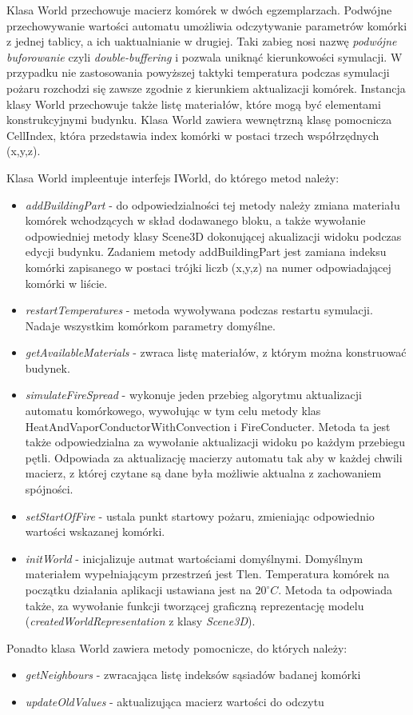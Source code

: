 Klasa World przechowuje macierz komórek w dwóch egzemplarzach. Podwójne przechowywanie wartości automatu umożliwia odczytywanie parametrów komórki z jednej tablicy, a ich uaktualnianie w drugiej. Taki zabieg nosi nazwę \textit{podwójne buforowanie} czyli \textit{double-buffering} i pozwala uniknąć kierunkowości symulacji. W przypadku nie zastosowania powyższej taktyki temperatura podczas symulacji pożaru rozchodzi się zawsze zgodnie z kierunkiem aktualizacji komórek. Instancja klasy World przechowuje także listę materiałów, które mogą być elementami konstrukcyjnymi budynku. Klasa World zawiera wewnętrzną klasę pomocnicza CellIndex,  która przedstawia index komórki w postaci trzech współrzędnych (x,y,z).

Klasa World impleentuje interfejs IWorld, do którego metod należy:
\begin{itemize}
\item \textit{addBuildingPart} - do odpowiedzialności tej metody należy zmiana materiału komórek wchodzących w skład dodawanego bloku, a także wywołanie odpowiedniej metody klasy Scene3D dokonującej akualizacji widoku podczas edycji budynku. Zadaniem metody addBuildingPart jest zamiana indeksu komórki zapisanego w postaci trójki liczb (x,y,z) na numer odpowiadającej komórki w liście.
\item \textit{restartTemperatures} - metoda wywoływana podczas restartu symulacji. Nadaje wszystkim komórkom parametry domyślne.
\item \textit{getAvailableMaterials} - zwraca listę materiałów, z którym można konstruować budynek.
\item \textit{simulateFireSpread}  - wykonuje jeden przebieg algorytmu aktualizacji automatu komórkowego, wywołując w tym celu metody klas HeatAndVaporConductorWithConvection i FireConducter. Metoda ta jest także odpowiedzialna za wywołanie aktualizacji widoku po każdym przebiegu pętli. Odpowiada za aktualizację macierzy automatu tak aby w każdej chwili macierz, z której czytane są dane była możliwie aktualna z zachowaniem spójności.
\item \textit{setStartOfFire} - ustala punkt startowy pożaru, zmieniając odpowiednio wartości wskazanej komórki.
\item \textit{initWorld} - inicjalizuje autmat wartościami domyślnymi. Domyślnym materiałem wypełniającym przestrzeń jest Tlen. Temperatura komórek na początku działania aplikacji ustawiana jest na $20^\circ C$. Metoda ta odpowiada także, za wywołanie funkcji tworzącej graficzną reprezentację modelu (\textit{createdWorldRepresentation} z klasy \textit{Scene3D}).
\end{itemize}
Ponadto klasa World zawiera metody pomocnicze, do których należy:
\begin{itemize}
\item \textit{getNeighbours} - zwracająca listę indeksów sąsiadów badanej komórki
\item \textit{updateOldValues} - aktualizująca macierz wartości do odczytu
\end{itemize}

